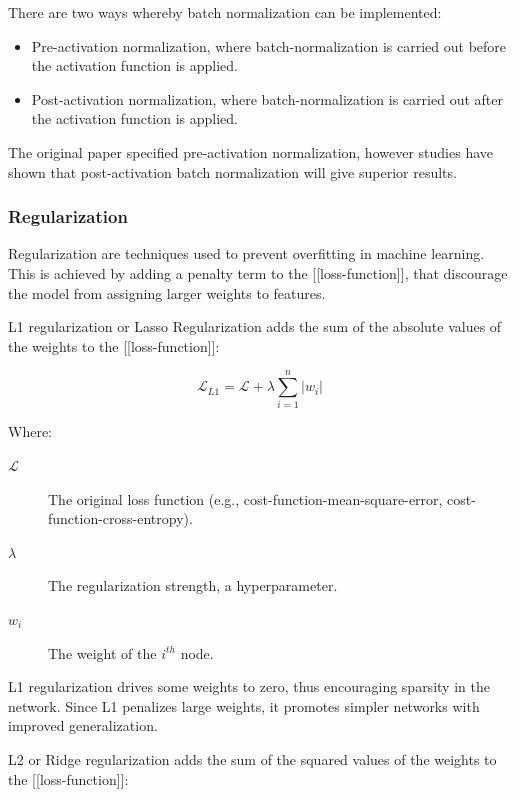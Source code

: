		
		There are two ways whereby batch normalization can be implemented:
		
		\begin{itemize}
			\item Pre-activation normalization, where batch-normalization is carried out before the activation function is applied.
			\item Post-activation normalization, where batch-normalization is carried out after the activation function is applied.
		\end{itemize}
		\bigskip
		
		The original paper specified pre-activation normalization, however studies have shown that post-activation batch normalization will give superior results.



		\bigskip
		\subsubsection{Regularization}
		
		Regularization are techniques used to prevent overfitting in machine learning. This is achieved by adding a penalty term to the [[loss-function]], that discourage the model from assigning larger weights to features.
		
		L1 regularization or Lasso Regularization adds the sum of the absolute values of the weights to the [[loss-function]]:
		
		\begin{equation}
			\mathcal{L}_{L1} = \mathcal{L} + \lambda \sum_{i=1}^n |w_i|
		\end{equation}

		
		Where:
		\begin{description}
			\item[$\mathcal{L}$] The original loss function (e.g., cost-function-mean-square-error, cost-function-cross-entropy).
			\item[$\lambda$] The regularization strength, a hyperparameter.
			\item[$w_i$] The weight of the $i^{th}$ node.
		\end{description}
		\bigskip
		
		L1 regularization drives some weights to zero, thus encouraging sparsity in the network. Since L1 penalizes large weights, it promotes simpler networks with improved generalization.
		
		L2 or Ridge regularization adds the sum of the squared values of the weights to the [[loss-function]]:
		


